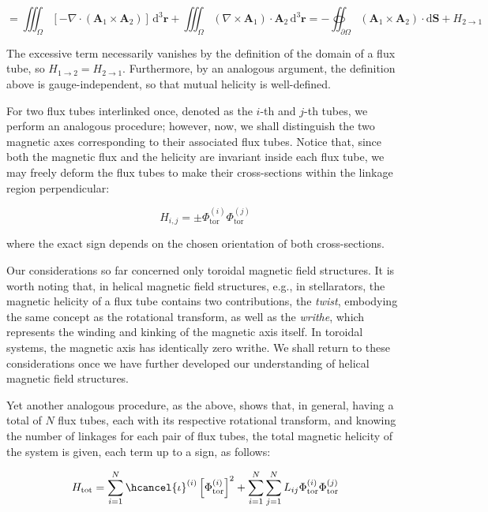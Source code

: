 \begin{equation}
    =\iiint_\Omega\left[-\nabla\cdot\left(\mathbf{A}_1\times\mathbf{A}_2\right)\right]\,\mathrm{d}^3\mathbf{r}+\iiint_\Omega(\nabla\times\mathbf{A}_1)\cdot\mathbf{A}_2\,\mathrm{d}^3\mathbf{r}=-\oiint_{\partial\Omega}\left(\mathbf{A}_1\times\mathbf{A}_2\right)\cdot\mathrm{d}\mathbf{S}+H_{2\to1}
\end{equation}

The excessive term necessarily vanishes by the definition of the domain of a flux tube, so $H_{1\to2}=H_{2\to1}$. Furthermore, by an analogous argument, the definition above is gauge-independent, so that mutual helicity is well-defined.

\quad For two flux tubes interlinked once, denoted as the $i$-th and $j$-th tubes, we perform an analogous procedure; however, now, we shall distinguish the two magnetic axes corresponding to their associated flux tubes. Notice that, since both the magnetic flux and the helicity are invariant inside each flux tube, we may freely deform the flux tubes to make their cross-sections within the linkage region perpendicular:

\begin{equation}
    H_{i,j}=\pm\Phi_\text{tor}^{(i)}\Phi_\text{tor}^{(j)}
\end{equation}

where the exact sign depends on the chosen orientation of both cross-sections.

\quad Our considerations so far concerned only toroidal magnetic field structures. It is worth noting that, in helical magnetic field structures, e.g., in stellarators, the magnetic helicity of a flux tube contains two contributions, the \textit{twist}, embodying the same concept as the rotational transform, as well as the \textit{writhe}, which represents the winding and kinking of the magnetic axis itself. In toroidal systems, the magnetic axis has identically zero writhe. We shall return to these considerations once we have further developed our understanding of helical magnetic field structures.

\quad Yet another analogous procedure, as the above, shows that, in general, having a total of $N$ flux tubes, each with its respective rotational transform, and knowing the number of linkages for each pair of flux tubes, the total magnetic helicity of the system is given, each term up to a sign, as follows:

\begin{equation}
    \label{eq-6-33}
    H_\text{tot}=\sum_{i=1}^N\hcancel{\iota}^{(i)}\left[\Phi_\text{tor}^{(i)}\right]^2+\sum_{i=1}^{N}\sum_{j=1}^NL_{ij}\Phi_\text{tor}^{(i)}\Phi_\text{tor}^{(j)}
\end{equation}


